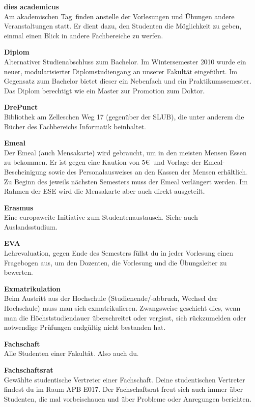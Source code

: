 \textbf{dies academicus} \\
Am \glqq akademischen Tag\grqq\ finden anstelle der Vorlesungen und Übungen andere Veranstaltungen statt.
Er dient dazu, den Studenten die Möglichkeit zu geben, einmal einen Blick in andere Fachbereiche zu werfen.

\textbf{Diplom} \\
Alternativer Studienabschluss zum Bachelor.
Im Wintersemester 2010 wurde ein neuer, modularisierter Diplomstudiengang an unserer Fakultät eingeführt.
Im Gegensatz zum Bachelor bietet dieser ein Nebenfach und ein Praktikumssemester.
Das Diplom berechtigt wie ein Master zur Promotion zum Doktor.

\textbf{DrePunct} \\
Bibliothek am Zelleschen Weg 17 (gegenüber der SLUB), die unter anderem die Bücher des Fachbereichs Informatik beinhaltet.

\textbf{Emeal} \\
Der Emeal (auch Mensakarte) wird gebraucht, um in den meisten Mensen Essen zu bekommen.
Er ist gegen eine Kaution von 5\euro\ und Vorlage der Emeal-Bescheinigung sowie des Personalausweises an den Kassen der Mensen erhältlich.
Zu Beginn des jeweils nächsten Semesters muss der Emeal verlängert werden.
Im Rahmen der ESE wird die Mensakarte aber auch direkt ausgeteilt.

\textbf{Erasmus} \\
Eine europaweite Initiative zum Studentenaustausch.
Siehe auch Auslandsstudium.

\textbf{EVA} \\
Lehrevaluation, gegen Ende des Semesters füllst du in jeder Vorlesung einen Fragebogen aus, um den Dozenten, die Vorlesung und die Übungsleiter zu bewerten.

\textbf{Exmatrikulation} \\
Beim Austritt aus der Hochschule (Studienende/-abbruch, Wechsel der Hochschule) muss man sich exmatrikulieren.
Zwangsweise geschieht dies, wenn man die Höchststudiendauer überschreitet oder vergisst, sich rückzumelden oder notwendige Prüfungen endgültig nicht bestanden hat.

\textbf{Fachschaft} \\
Alle Studenten einer Fakultät. Also auch du.

\textbf{Fachschaftsrat} \\
Gewählte studentische Vertreter einer Fachschaft.
Deine studentischen Vertreter findest du im Raum APB E017.
Der Fachschaftsrat freut sich auch immer über Studenten, die mal vorbeischauen und über Probleme oder Anregungen berichten.


